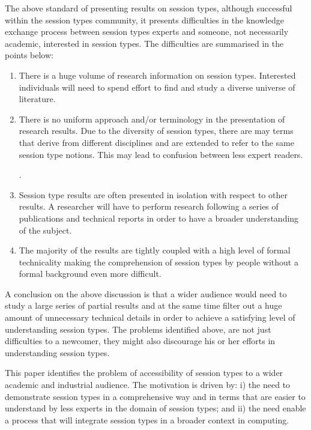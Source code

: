 The above standard of presenting results on session types,
although successful within the session types community,
it presents difficulties in the knowledge exchange process between 
session types experts and someone, not necessarily academic, interested
in session types. The difficulties are summarised in the points
below:
%
\begin{enumerate}
	\item	There is a huge volume of research information on session types.
			Interested individuals will need to spend effort to find
			and study a diverse universe of literature.

	\item	There is no uniform approach and/or terminology
			in the presentation of research results.
			Due to the diversity of session types,
			there are may terms that derive from different
			disciplines and are extended to refer to
			the same session type notions.
			This may lead to confusion between less
			expert readers.

			.

	\item	Session type results are often presented in
			isolation with respect to other results.
			A researcher will have to perform research
			following a series of publications and
			technical reports in order to have a broader
			understanding of the subject.

	\item	The majority of the results are tightly coupled
			with a high level of formal technicality making the
			comprehension of session types by people without
			a formal background even more difficult.
\end{enumerate}
%
A conclusion on the above discussion is that a wider
audience would need to study a large series of partial
results and at the same time filter out a huge amount
of unnecessary technical details in order to achieve a satisfying
level of understanding session types.
The problems identified above, are not just difficulties
to a newcomer, they might also discourage his or her
efforts in understanding session types.

This paper identifies the problem of accessibility of session
types to a wider academic and industrial audience. 
The motivation is driven by:
i) the need to demonstrate session types in a comprehensive way and in
terms that are easier to understand by less experts in the domain of
session types; and ii) the need enable a process that will
integrate session types in a broader context in computing.

